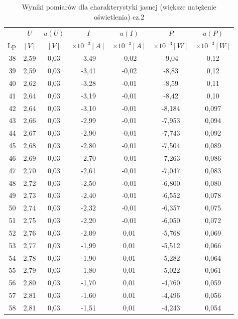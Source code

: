 \documentclass[polish, 11pt, a4paper]{article}
\begin{document}
		\begin{table}[H]
			\centering
			\caption{Wyniki pomiarów dla charakterystyki jasnej (większe natężenie oświetlenia) cz.2}
			\begin{tabular}{|r|c|c|c|c|c|c|}\hline
				&	\(U\)	&	\(u(U)\)	&	\(I\)	&	\(u(I)\)	&	\(P\)	&	\(u(P)\)	\\
				Lp	&	\([V]\)	&	\([V]\)	&	\(\times10^{-3} [A]\)	&	\(\times10^{-3} [A]\)	&	\(\times10^{-3} [W]\)	&	\(\times10^{-3} [W]\)	\\\hline
				38	&	2,59	&	0,03	&	-3,49	&	-0,02	&	-9,04	&	0,12	\\\hline
				39	&	2,59	&	0,03	&	-3,41	&	-0,02	&	-8,83	&	0,12	\\\hline
				40	&	2,62	&	0,03	&	-3,28	&	-0,01	&	-8,59	&	0,11	\\\hline
				41	&	2,64	&	0,03	&	-3,19	&	-0,01	&	-8,42	&	0,10	\\\hline
				42	&	2,64	&	0,03	&	-3,10	&	-0,01	&	-8,184	&	0,097	\\\hline
				43	&	2,66	&	0,03	&	-2,99	&	-0,01	&	-7,953	&	0,094	\\\hline
				44	&	2,67	&	0,03	&	-2,90	&	-0,01	&	-7,743	&	0,092	\\\hline
				45	&	2,68	&	0,03	&	-2,80	&	-0,01	&	-7,504	&	0,089	\\\hline
				46	&	2,69	&	0,03	&	-2,70	&	-0,01	&	-7,263	&	0,086	\\\hline
				47	&	2,70	&	0,03	&	-2,61	&	-0,01	&	-7,047	&	0,083	\\\hline
				48	&	2,72	&	0,03	&	-2,50	&	-0,01	&	-6,800	&	0,080	\\\hline
				49	&	2,73	&	0,03	&	-2,40	&	-0,01	&	-6,552	&	0,078	\\\hline
				50	&	2,74	&	0,03	&	-2,32	&	-0,01	&	-6,357	&	0,075	\\\hline
				51	&	2,75	&	0,03	&	-2,20	&	-0,01	&	-6,050	&	0,072	\\\hline
				52	&	2,76	&	0,03	&	-2,09	&	0,01	&	-5,768	&	0,069	\\\hline
				53	&	2,77	&	0,03	&	-1,99	&	0,01	&	-5,512	&	0,066	\\\hline
				54	&	2,78	&	0,03	&	-1,90	&	0,01	&	-5,282	&	0,064	\\\hline
				55	&	2,79	&	0,03	&	-1,80	&	0,01	&	-5,022	&	0,061	\\\hline
				56	&	2,80	&	0,03	&	-1,70	&	0,01	&	-4,760	&	0,059	\\\hline
				57	&	2,81	&	0,03	&	-1,60	&	0,01	&	-4,496	&	0,056	\\\hline
				58	&	2,81	&	0,03	&	-1,51	&	0,01	&	-4,243	&	0,054	\\\hline

\end{tabular}
\end{table}
\end{document}

